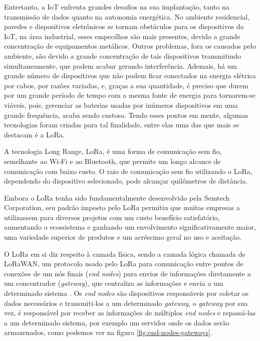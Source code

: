Entretanto, a IoT enfrenta grandes desafios na sua implantação, tanto na transmissão de dados quanto na autonomia energética. No ambiente residencial, paredes e dispositivos eletrônicos se tornam obstáculos para os dispositivos da IoT, na área industrial, esses empecilhos são mais presentes, devido a grande concentração de equipamentos metálicos. Outros problemas, fora os causados pelo ambiente, são devido a grande concentração de tais dispositivos transmitindo simultaneamente, que podem acabar gerando interferência. Ademais, há um grande número de dispositivos que não podem ficar conectados na energia elétrica por cabos, por razões variadas, e, graças a sua quantidade, é preciso que  durem por um grande período de tempo com a mesma fonte de energia para tornarem-se viáveis, pois, gerenciar as baterias usadas por inúmeros dispositivos em uma grande frequência, acaba sendo custoso. Tendo esses pontos em mente, algumas tecnologias foram criadas para tal finalidade, entre elas uma das que mais se destacam é a LoRa.

A tecnologia Long Range, LoRa, é uma forma de comunicação sem fio, semelhante ao Wi-Fi e ao Bluetooth, que permite um longo alcance de comunicação com baixo custo. O raio de comunicação sem fio utilizando o LoRa, dependendo do dispositivo selecionado, pode alcançar quilômetros de distância.

Embora o LoRa tenha sido fundamentalmente desenvolvido pela Semtech Corporation, seu padrão imposto pelo LoRa permitiu que muitas empresas a utilizassem para diversos projetos com um custo benefício satisfatório, aumentando o ecossistema e ganhando um envolvimento significativamente maior, uma variedade superior de produtos e um acréscimo geral no uso e aceitação. 

O LoRa em si diz respeito à camada física, sendo a camada lógica chamada de LoRaWAN, um protocolo usado pelo LoRa para comunicação entre pontos de conexões de um nós finais (\textit{end nodes}) para envios de informações diretamente a um concentrador (\textit{gateway}), que centraliza as informações e envia a um determinado sistema \cite{lora2021specification}. Os \textit{end nodes} são dispositivos responsáveis por coletar os dados necessários e transmiti-los a um determinado \textit{gateway}, o \textit{gateway} por sua vez, é responsável por receber as informações de múltiplos \textit{end nodes} e repassá-las a um determinado sistema, por exemplo um servidor onde os dados serão armazenados, como podemos ver na figura \ref{fig:end-nodes-gateways}.

